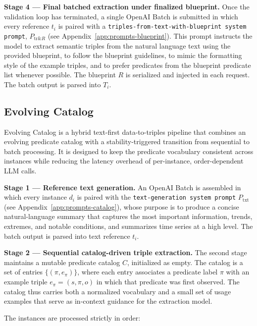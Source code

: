 \textbf{Stage 4 --- Final batched extraction under finalized blueprint.}
Once the validation loop has terminated, a single OpenAI Batch is submitted in which every reference $t_i$ is paired with a \texttt{triples-from-text-with-blueprint system prompt}, $P_{\mathrm{tr}\&R}$ (see Appendix~\ref{app:prompts-blueprint}). This prompt instructs the model to extract semantic triples from the natural language text using the provided blueprint, to follow the blueprint guidelines, to mimic the formatting style of the example triples, and to prefer predicates from the blueprint predicate list whenever possible. The blueprint $R$ is serialized and injected in each request. The batch output is parsed into $T_i$.

\subsection{Evolving Catalog}

Evolving Catalog is a hybrid text-first data-to-triples pipeline that combines an evolving predicate catalog with a stability-triggered transition from sequential to batch processing. It is designed to keep the predicate vocabulary consistent across instances while reducing the latency overhead of per-instance, order-dependent LLM calls.

\textbf{Stage 1 --- Reference text generation.}
An OpenAI Batch is assembled in which every instance $d_i$ is paired with the \texttt{text-generation system prompt} $P_{\mathrm{txt}}$ (see Appendix~\ref{app:prompts-catalog}), whose purpose is to produce a concise natural-language summary that captures the most important information, trends, extremes, and notable conditions, and summarizes time series at a high level. The batch output is parsed into text reference $t_i$.

\textbf{Stage 2 --- Sequential catalog-driven triple extraction.}
The second stage maintains a mutable predicate catalog $C$, initialized as empty. The catalog is a set of entries $\{(\pi, e_\pi)\}$, where each entry associates a predicate label $\pi$ with an example triple $e_\pi = (s, \pi, o)$ in which that predicate was first observed. The catalog thus carries both a normalized vocabulary and a small set of usage examples that serve as in-context guidance for the extraction model.

The instances are processed strictly in order:

